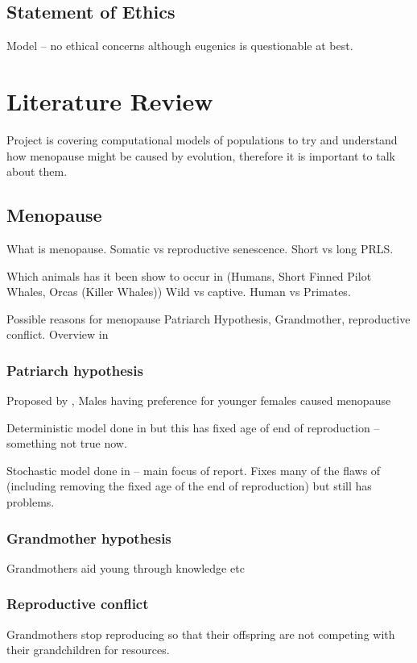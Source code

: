 \documentclass[authoryearcitations]{UoYCSproject}
\begin{document}
\section{Statement of Ethics}
Model -- no ethical concerns although eugenics is questionable at best.

\chapter{Literature Review}
\label{cha:Literature Review}
Project is covering computational models of populations to try and understand how menopause might be caused by evolution, therefore it is important to talk about them.

\section{Menopause}
What is menopause. Somatic vs reproductive senescence. Short vs long PRLS.

Which animals has it been show to occur in (Humans, Short Finned Pilot Whales, Orcas (Killer Whales)) Wild vs captive. Human vs Primates.

Possible reasons for menopause Patriarch Hypothesis, Grandmother, reproductive conflict. Overview in \cite{evolutionPRLS2015}

\subsection{Patriarch hypothesis}
Proposed by \cite{patriarchHypothesis2000} , Males having preference for younger females caused menopause

Deterministic model done in \cite{whyMenMatter2007} but this has fixed age of end of reproduction -- something not true now.

Stochastic model done in \cite{mateChoice2013} -- main focus of report. Fixes many of the flaws of \cite{whyMenMatter2007} (including removing the fixed age of the end of reproduction) but still has problems.


\subsection{Grandmother hypothesis}
Grandmothers aid young through knowledge etc

\subsection{Reproductive conflict}
Grandmothers stop reproducing so that their offspring are not competing with their grandchildren for resources. \cite{repConflictOrca2017}
\end{document}
